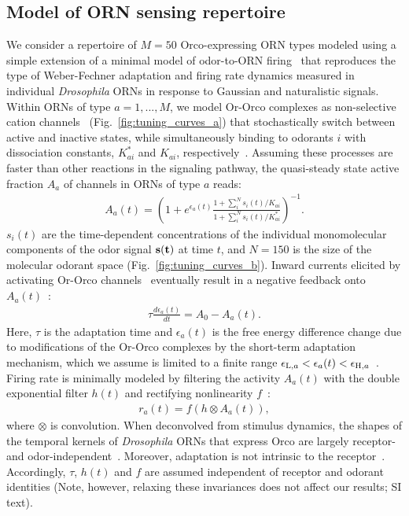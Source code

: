 \documentclass[9pt,twocolumn,twoside]{pnas-new}
\begin{document}
\subsection*{Model of ORN sensing repertoire}

We consider a repertoire of $M=50$ Orco-expressing ORN types modeled using a simple extension of a minimal model of odor-to-ORN firing~\cite{srinivas_elife} that reproduces the type of Weber-Fechner adaptation and firing rate dynamics measured in individual \textit{Drosophila} ORNs in response to Gaussian and naturalistic signals. Within ORNs of type $a=1,...,M$, we model Or-Orco complexes as non-selective cation channels~\cite{orco_structure} (Fig.~\ref{fig:tuning_curves_a}) that stochastically switch between active and inactive states, while simultaneously binding to odorants $i$ with dissociation constants, $K^*_{ai}$ and $K_{ai}$, respectively~\cite{nagel_wilson_biophysical,srinivas_elife}. Assuming these processes are faster than other reactions in the signaling pathway, the quasi-steady state active fraction $A_a$ of channels in ORNs of type $a$ reads:
\begin{align}
A_a(t) = \left(1 + e^{\epsilon_a(t)}\frac{1 + \sum_i^N s_i(t)/K_{ai}}{1 + \sum_i^N s_i(t)/K^*_{ai}}\right)^{-1}.
\label{eq:steady_state_act_OR}
\end{align}
$s_i(t)$ are the time-dependent concentrations of the individual monomolecular components of the odor signal $\bf{s}(t)$ at time $t$, and $N=150$ is the size of the molecular odorant space (Fig.~\ref{fig:tuning_curves_b}). Inward currents elicited by activating Or-Orco channels~\cite{orco_structure} eventually result in a negative feedback onto $A_a(t)$~\cite{nagel_wilson_biophysical,srinivas_elife,cao_WL}:
\begin{align}
\tau\frac{d\epsilon_a(t)}{dt} = {A}_{0} - A_a(t).
\label{eq:adaptation_dynamics}
\end{align}
Here, $\tau$ is the adaptation time and $\epsilon_a(t)$ is the free energy difference change due to modifications of the Or-Orco complexes by the short-term adaptation mechanism, which we assume is limited to a finite range $\epsilon_{\textup{L}, a} < \epsilon_a(t) < \epsilon_{\textup{H}, a}$~\cite{srinivas_elife}. Firing rate is minimally modeled by filtering the activity $A_a(t)$ with the double exponential filter $h(t)$ and rectifying nonlinearity $f$~\cite{srinivas_elife}:
\begin{align}
r_a(t)=f\left(h\otimes A_a(t)\right),
\label{eq:firing_machinery}
\end{align}
where $\otimes$ is convolution. When deconvolved from stimulus dynamics, the shapes of the temporal kernels of \textit{Drosophila} ORNs that express Orco are largely receptor- and odor-independent~\cite{martelli,srinivas_elife,si2017invariances}. Moreover, adaptation is not intrinsic to the receptor~\cite{nagel_wilson_biophysical}. Accordingly, $\tau$, $h(t)$ and $f$ are assumed independent of receptor and odorant identities (Note, however, relaxing these invariances does not affect our results; SI text).
\end{document}
